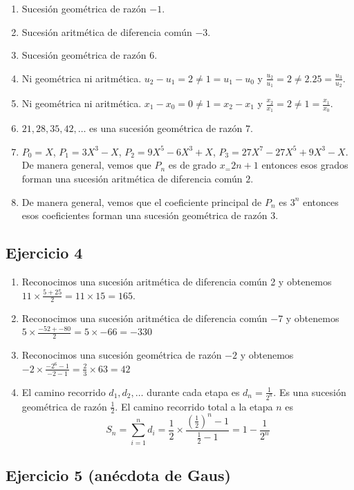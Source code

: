 \begin{enumerate}
\item Sucesión geométrica de razón $-1$.
\item Sucesión aritmética de diferencia común $-3$.
\item Sucesión geométrica de razón $6$.
\item Ni geométrica ni aritmética. $u_2 - u_1 = 2 \neq 1 = u_1 - u_0$ y
  $\frac{u_2}{u_1} = 2 \neq 2.25 = \frac{u_3}{u_2}$.
\item Ni geométrica ni aritmética. $x_1 - x_0 = 0 \neq 1 = x_2 - x_1$
  y $\frac{x_2}{x_1} = 2 \neq 1 = \frac{x_1}{x_0}$.
\item $21, 28, 35, 42, \ldots$ es una sucesión geométrica de razón $7$.
\item $P_0 = X$, $P_1 = 3X^3 - X$, $P_2 = 9X^5-6X^3+X$,
  $P_3 = 27X^7-27X^5+9X^3-X$. De manera general, vemos que $P_n$ es de grado
  $x_=2n+1$ entonces esos grados forman una sucesión aritmética de 
  diferencia común $2$.
\item De manera general, vemos que el coeficiente principal de $P_n$ es
  $3^n$ entonces esos coeficientes forman una sucesión geométrica de 
  razón $3$.
\end{enumerate}

\subsection*{Ejercicio 4}

\begin{enumerate}
\item Reconocimos una sucesión aritmética de diferencia común 2 y obtenemos
  $11 \times \frac{5 + 25}{2} = 11 \times 15 = 165$.
\item Reconocimos una sucesión aritmética de diferencia común $-7$ y obtenemos
  $5 \times \frac{-52 + -80}{2} = 5 \times -66 = -330$
\item Reconocimos una sucesión geométrica de razón $-2$ y obtenemos
  $-2 \times \frac{{-2}^{6} - 1}{-2 - 1} = \frac{2}{3} \times 63 = 42$
\item El camino recorrido $d_1, d_2, \ldots$ durante cada etapa es
  $d_n = \frac{1}{2^n}$. Es una sucesión geométrica de razón $\frac{1}{2}$. El
  camino recorrido total a la etapa $n$ es
  $$
  S_n = \sum_{i=1}^n d_i = \frac{1}{2} \times \frac{\left(\frac{1}{2}\right)^n - 1}{\frac{1}{2} - 1} = 1 - \frac{1}{2^n}
  $$
\end{enumerate}

\subsection*{Ejercicio 5 (anécdota de Gaus)}

